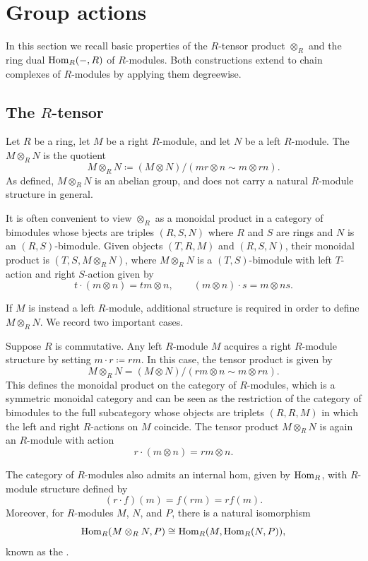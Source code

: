 \section{Group actions}\label{Groups}
In this section we recall basic properties of the $R$-tensor product $\otimes_R$ and the ring dual $\mathrm{Hom}_R(-,R)$ of $R$-modules. Both constructions extend to chain complexes of $R$-modules by applying them degreewise.

\subsection{The $R$-tensor}

Let $R$ be a ring, let $M$ be a right $R$-module, and let $N$ be a left $R$-module. The  $M \otimes_R N$ is the quotient
\[
M \otimes_R N \coloneqq (M \otimes N) \big/ (mr \otimes n \sim m \otimes rn).
\]
As defined, $M \otimes_R N$ is an abelian group, and does not carry a natural $R$-module structure in general.

It is often convenient to view $\otimes_R$ as a monoidal product in a category of bimodules whose bjects are triples $(R,S,N)$ where $R$ and $S$ are rings and $N$ is an $(R,S)$-bimodule. Given objects $(T,R,M)$ and $(R,S,N)$, their monoidal product is $(T,S,M \otimes_R N)$, where $M \otimes_R N$ is a $(T,S)$-bimodule with left $T$-action and right $S$-action given by
\[
t \cdot (m \otimes n) = tm \otimes n,
\qquad
(m \otimes n) \cdot s = m \otimes ns.
\]

If $M$ is instead a left $R$-module, additional structure is required in order to define $M \otimes_R N$. We record two important cases.

\begin{example}
Suppose $R$ is commutative. Any left $R$-module $M$ acquires a right $R$-module structure by setting $m \cdot r \coloneqq rm$. In this case, the tensor product is given by
\[
M \otimes_R N = (M \otimes N) \big/ (rm \otimes n \sim m \otimes rn).
\]
This defines the monoidal product on the category of $R$-modules, which is a symmetric monoidal category and can be seen as the restriction of the category of bimodules to the full subcategory whose objects are triplets $(R,R, M)$ in which the left and right $R$-actions on $M$ coincide. The tensor product $M \otimes_R N$ is again an $R$-module with action
\[
r \cdot (m \otimes n) = rm \otimes n.
\]

The category of $R$-modules also admits an internal hom, given by $\mathrm{Hom}_R$, with $R$-module structure defined by
\[
(r \cdot f)(m) = f(rm) = r f(m).
\]
Moreover, for $R$-modules $M$, $N$, and $P$, there is a natural isomorphism
\[
\mathrm{Hom}_R(M \otimes_R N, P) \cong \mathrm{Hom}_R(M, \mathrm{Hom}_R(N,P)),
\]
known as the .
\end{example}

